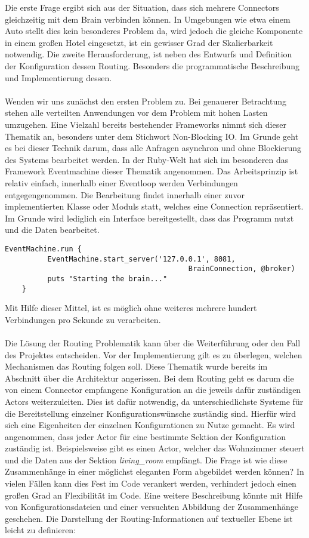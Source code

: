 Die erste Frage ergibt sich aus der Situation, dass sich mehrere Connectors gleichzeitig mit dem Brain verbinden können. In Umgebungen wie etwa einem Auto stellt dies kein besonderes Problem da, wird jedoch die gleiche Komponente in einem großen Hotel eingesetzt, ist ein gewisser Grad der Skalierbarkeit notwendig. Die zweite Herausforderung, ist neben des Entwurfs und Definition der Konfiguration dessen Routing. Besonders die programmatische Beschreibung und Implementierung dessen. 
\\\\
Wenden wir uns zunächst den ersten Problem zu. Bei genauerer Betrachtung stehen alle verteilten Anwendungen vor dem Problem mit hohen Lasten umzugehen. Eine Vielzahl bereits bestehender Frameworks nimmt sich dieser Thematik an, besonders unter dem Stichwort Non-Blocking IO. Im Grunde geht es bei dieser Technik darum, dass alle Anfragen asynchron und ohne Blockierung des Systems bearbeitet werden. In der Ruby-Welt hat sich im besonderen das Framework Eventmachine dieser Thematik angenommen. Das Arbeitsprinzip ist relativ einfach, innerhalb einer Eventloop werden Verbindungen entgegengenommen. Die Bearbeitung findet innerhalb einer zuvor implementierten Klasse oder Moduls statt, welches eine Connection repräsentiert. Im Grunde wird lediglich ein Interface bereitgestellt, dass das Programm nutzt und die Daten bearbeitet. 

\lstset{language=Ruby}
\begin{lstlisting}[caption=Server-Initialisierung des Brain, captionpos=b]
	EventMachine.run {
		  EventMachine.start_server('127.0.0.1', 8081, 
									       BrainConnection, @broker)
		  puts "Starting the brain..."
	}
\end{lstlisting}

Mit Hilfe dieser Mittel, ist es möglich ohne weiteres mehrere hundert Verbindungen pro Sekunde zu verarbeiten. 
\\\\
Die Lösung der Routing Problematik kann über die Weiterführung oder den Fall des Projektes entscheiden. Vor der Implementierung gilt es zu überlegen, welchen Mechanismen das Routing folgen soll. Diese Thematik wurde bereits im Abschnitt über die Architektur angerissen. Bei dem Routing geht es darum die von einem Connector empfangene Konfiguration an die jeweils dafür zuständigen Actors weiterzuleiten. Dies ist dafür notwendig, da unterschiedlichste Systeme für die Bereitstellung einzelner Konfigurationswünsche zuständig sind. Hierfür wird sich eine Eigenheiten der einzelnen Konfigurationen zu Nutze gemacht. Es wird angenommen, dass jeder Actor für eine bestimmte Sektion der Konfiguration zuständig ist. Beispielsweise gibt es einen Actor, welcher das Wohnzimmer steuert und die Daten aus der Sektion \emph{living\_room} empfängt. Die Frage ist wie diese Zusammenhänge in einer möglichst eleganten Form abgebildet werden können? 
In vielen Fällen kann dies Fest im Code verankert werden, verhindert jedoch einen großen Grad an Flexibilität im Code. Eine weitere Beschreibung könnte mit Hilfe von Konfigurationsdateien und einer versuchten Abbildung der Zusammenhänge geschehen. Die Darstellung der Routing-Informationen auf textueller Ebene ist leicht zu definieren: 

